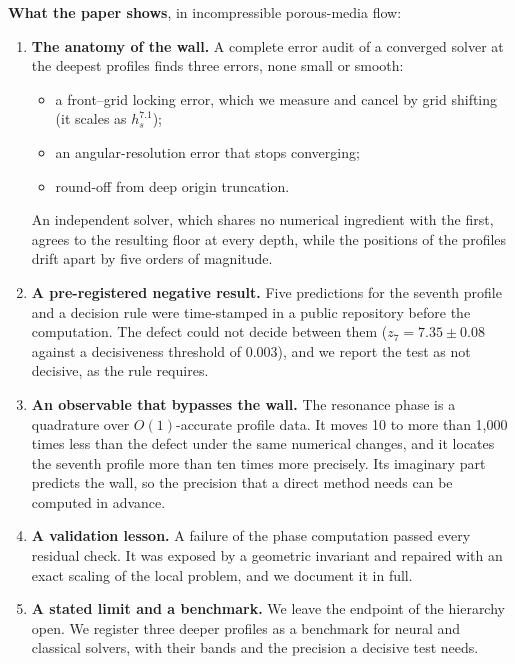 \documentclass[11pt]{article}
\begin{document}
\textbf{What the paper shows}, in incompressible porous-media flow:
\begin{enumerate}
\item \textbf{The anatomy of the wall.} A complete error audit of a converged solver at the deepest profiles finds
three errors, none small or smooth:
\begin{itemize}
\item a front--grid locking error, which we measure and cancel by grid shifting (it scales as $h_s^{7.1}$);
\item an angular-resolution error that stops converging;
\item round-off from deep origin truncation.
\end{itemize}
An independent solver, which shares no numerical ingredient with the first, agrees to the resulting floor at every
depth, while the positions of the profiles drift apart by five orders of magnitude.
\item \textbf{A pre-registered negative result.} Five predictions for the seventh profile and a decision rule were
time-stamped in a public repository before the computation. The defect could not decide between them
($z_7=7.35\pm0.08$ against a decisiveness threshold of $0.003$), and we report the test as not decisive, as the rule
requires.
\item \textbf{An observable that bypasses the wall.} The resonance phase is a quadrature over $O(1)$-accurate profile
data. It moves 10 to more than 1,000 times less than the defect under the same numerical changes, and it locates
the seventh profile more than ten times more precisely. Its imaginary part predicts the wall, so the precision that a
direct method needs can be computed in advance.
\item \textbf{A validation lesson.} A failure of the phase computation passed every residual check. It was exposed by
a geometric invariant and repaired with an exact scaling of the local problem, and we document it in full.
\item \textbf{A stated limit and a benchmark.} We leave the endpoint of the hierarchy open. We register three deeper
profiles as a benchmark for neural and classical solvers, with their bands and the precision a decisive test needs.
\end{enumerate}
\end{document}
